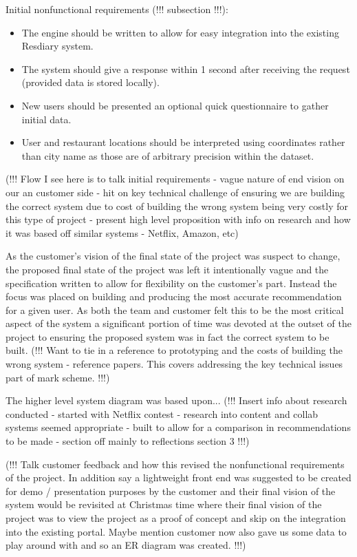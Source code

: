 \documentclass{l3proj}
\begin{document}
Initial nonfunctional requirements (!!! subsection !!!):
\begin{itemize}
\item The engine should be written to allow for easy integration into the existing Resdiary system.
\item The system should give a response within 1 second after receiving the request (provided data is stored locally).
\item New users should be presented an optional quick questionnaire to gather initial data.
\item User and restaurant locations should be interpreted using coordinates rather than city  name as those are of arbitrary precision within the dataset.
\end{itemize}

(!!! Flow I see here is to talk initial requirements - vague nature of end vision on our an customer side - hit on key technical challenge of ensuring we are building the correct system due to cost of building the wrong system being very costly for this type of project - present high level proposition with info on research and how it was based off similar systems - Netflix, Amazon, etc) 

As the customer’s vision of the final state of the project was suspect to change, the proposed final state of the project was left it intentionally vague and the specification written to allow for flexibility on the customer’s part. Instead the focus was placed on building and producing the most accurate recommendation for a given user. As both the team and customer felt this to be the most critical aspect of the system a significant portion of time was devoted at the outset of the project to ensuring the proposed system was in fact the correct system to be built.  (!!! Want to tie in a reference to prototyping and the costs of building the wrong system - reference papers. This covers addressing the key technical issues part of mark scheme. !!!)

The higher level system diagram was based upon... 
(!!! Insert info about research conducted - started with Netflix contest - research into content and collab systems seemed appropriate - built to allow for a comparison in recommendations to be made - section off mainly to reflections section 3 !!!)

(!!! Talk customer feedback and how this revised the nonfunctional requirements of the project. In addition say a lightweight front end was suggested to be created for demo / presentation purposes by the customer and their final vision of the system would be revisited at Christmas time where their final vision of the project was to view the project as a proof of concept and skip on the integration into the existing portal. Maybe mention customer now also gave us some data to play around with and so an ER diagram was created. !!!)
\end{document}
